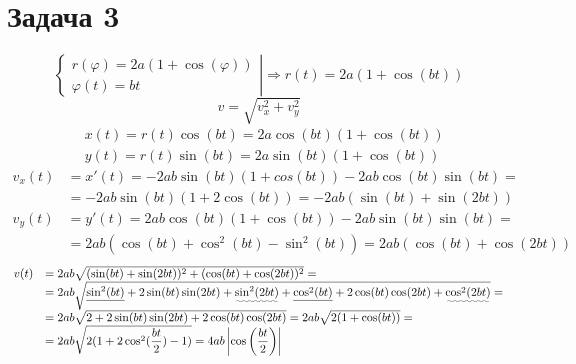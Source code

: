 \documentclass[12pt]{article}
\begin{document}
\begin{sloppypar}
    \section{Задача 3}
    \[
        \left\{\begin{array}{ll}
            r(\varphi) = 2a(1 + \cos(\varphi)) \\
            \varphi(t) = bt
        \end{array}\right|
        \Rightarrow r(t) = 2a(1 + \cos(bt))
    \]
    \[
        v = \sqrt{v_x^2 + v_y^2}
    \]
    \[
        \begin{array}{ll}
             & x(t) = r(t)\cos(bt) = 2a\cos(bt)(1 + \cos(bt)) \\
             & y(t) = r(t)\sin(bt) = 2a\sin(bt)(1 + \cos(bt))
        \end{array}
    \]
    \[
        \begin{array}{ll}
            v_x(t) & = x'(t) = -2ab\sin(bt)(1 + cos(bt)) - 2ab\cos(bt)\sin(bt) =           \\
                   & = -2ab\sin(bt)(1 + 2\cos(bt)) = -2ab(\sin(bt) + \sin(2bt))            \\
            v_y(t) & = y'(t) = 2ab\cos(bt)(1 + \cos(bt)) - 2ab\sin(bt)\sin(bt) =           \\
                   & = 2ab(\cos(bt) + \cos^2(bt) - \sin^2(bt)) = 2ab(\cos(bt) + \cos(2bt))
        \end{array}
    \]
    \[
        \begin{array}{ll}
            v(t) & = 2ab\sqrt{(\sin(bt) + \sin(2bt))^2 + (\cos(bt) + \cos(2bt))^2} =                              \\
                 & = 2ab\sqrt{\uline{\sin^2(bt)} + 2\sin(bt)\sin(2bt)
            + \uwave{\sin^2(2bt)} + \uline{\cos^2(bt)} + 2\cos(bt)\cos(2bt) + \uwave{\cos^2(2bt)}} =              \\
                 & = 2ab\sqrt{2 + 2\sin(bt)\sin(2bt) + 2\cos(bt)\cos(2bt)} = 2ab\sqrt{2(1 + \cos(bt))} =          \\
                 & = 2ab\sqrt{2(1 + 2\cos^2(\dfrac{bt}{2}) - 1)} = 4ab\left|\cos\left(\dfrac{bt}{2}\right)\right|
        \end{array}
    \]
\end{sloppypar}
\end{document}
